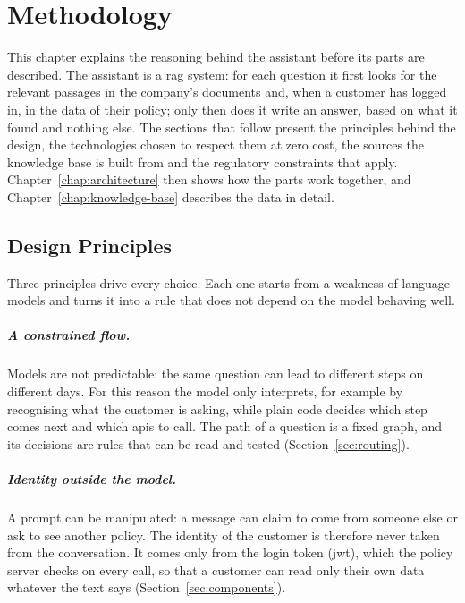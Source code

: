 \chapter{Methodology}
\label{chap:methodology}

This chapter explains the reasoning behind the assistant before its parts are described. The
assistant is a \ac{rag} system: for each question it first
looks for the relevant passages in the company's documents and, when a customer has logged in, in
the data of their policy; only then does it write an answer, based on what it found and nothing
else. The sections that follow present the principles behind the design, the technologies chosen
to respect them at zero cost, the sources the knowledge base is built from and the regulatory
constraints that apply. Chapter~\ref{chap:architecture} then shows how the parts work together,
and Chapter~\ref{chap:knowledge-base} describes the data in detail.

\section{Design Principles}
\label{sec:principles}

Three principles drive every choice. Each one starts from a weakness of language models and turns
it into a rule that does not depend on the model behaving well.

\paragraph{A constrained flow.} Models are not predictable: the same question can lead to
different steps on different days. For this reason the model only interprets, for example by
recognising what the customer is asking, while plain code decides which step comes next and which
\acsp{api} to call. The path of a question is a fixed graph, and its decisions are rules that can
be read and tested (Section~\ref{sec:routing}).

\paragraph{Identity outside the model.} A prompt can be manipulated: a message can claim to come
from someone else or ask to see another policy. The identity of the customer is therefore never
taken from the conversation. It comes only from the login token (\ac{jwt}), which the policy server
checks on every call, so that a customer can read only their own data whatever the text says
(Section~\ref{sec:components}).

